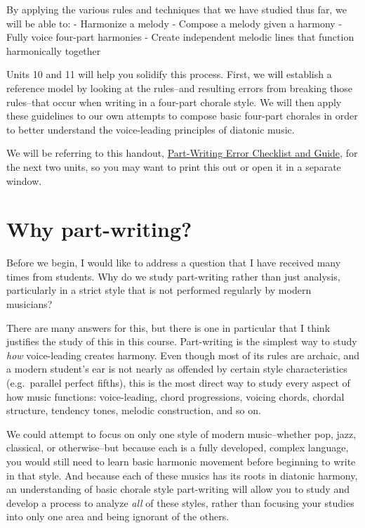 \documentclass{book}
\begin{document}
By applying the various rules and techniques that we have studied thus far, we
will be able to: - Harmonize a melody - Compose a melody given a harmony -
Fully voice four-part harmonies - Create independent melodic lines that
function harmonically together

Units 10 and 11 will help you solidify this process. First, we will establish
a reference model by looking at the rules--and resulting errors from breaking
those rules--that occur when writing in a four-part chorale style. We will
then apply these guidelines to our own attempts to compose basic four-part
chorales in order to better understand the voice-leading principles of
diatonic music.

We will be referring to this handout,
\href{https://docs.google.com/document/d/1s9Xd3LPqoaEevshTopxHzLX9jCzxVCZocOBLD_dceMU/edit?usp=sharing}{Part-Writing
Error Checklist and Guide}, for the next two units, so you may want to print
this out or open it in a separate window.

\hypertarget{why-part-writing}{%
\section{Why part-writing?}\label{why-part-writing}}

Before we begin, I would like to address a question that I have received many
times from students. Why do we study part-writing rather than just analysis,
particularly in a strict style that is not performed regularly by modern
musicians?

There are many answers for this, but there is one in particular that I think
justifies the study of this in this course. Part-writing is the simplest way
to study \emph{how} voice-leading creates harmony. Even though most of its
rules are archaic, and a modern student's ear is not nearly as offended by
certain style characteristics (e.g.~parallel perfect fifths), this is the most
direct way to study every aspect of how music functions: voice-leading, chord
progressions, voicing chords, chordal structure, tendency tones, melodic
construction, and so on.

We could attempt to focus on only one style of modern music--whether pop,
jazz, classical, or otherwise--but because each is a fully developed, complex
language, you would still need to learn basic harmonic movement before
beginning to write in that style. And because each of these musics has its
roots in diatonic harmony, an understanding of basic chorale style
part-writing will allow you to study and develop a process to analyze
\emph{all} of these styles, rather than focusing your studies into only one
area and being ignorant of the others.
\end{document}
